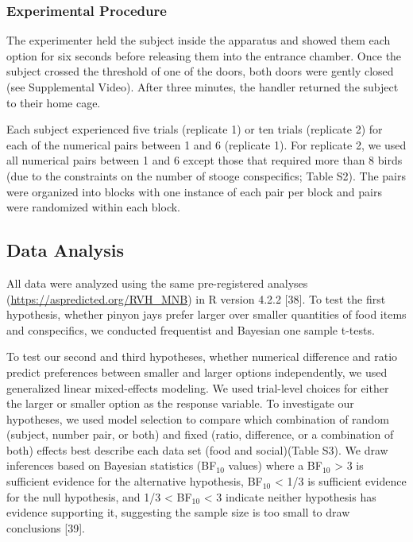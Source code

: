 \documentclass[
  ,pub,floatsintext]{apa6}
\begin{document}
\hypertarget{experimental-procedure-1}{%
\subsubsection{Experimental Procedure}\label{experimental-procedure-1}}

The experimenter held the subject inside the apparatus and showed them each option for six seconds before releasing them into the entrance chamber. Once the subject crossed the threshold of one of the doors, both doors were gently closed (see Supplemental Video). After three minutes, the handler returned the subject to their home cage.

Each subject experienced five trials (replicate 1) or ten trials (replicate 2) for each of the numerical pairs between 1 and 6 (replicate 1). For replicate 2, we used all numerical pairs between 1 and 6 except those that required more than 8 birds (due to the constraints on the number of stooge conspecifics; Table S2). The pairs were organized into blocks with one instance of each pair per block and pairs were randomized within each block.

\hypertarget{data-analysis}{%
\subsection{Data Analysis}\label{data-analysis}}

All data were analyzed using the same pre-registered analyses (\url{https://aspredicted.org/RVH_MNB}) in R version 4.2.2 {[}38{]}. To test the first hypothesis, whether pinyon jays prefer larger over smaller quantities of food items and conspecifics, we conducted frequentist and Bayesian one sample t-tests.

To test our second and third hypotheses, whether numerical difference and ratio predict preferences between smaller and larger options independently, we used generalized linear mixed-effects modeling. We used trial-level choices for either the larger or smaller option as the response variable. To investigate our hypotheses, we used model selection to compare which combination of random (subject, number pair, or both) and fixed (ratio, difference, or a combination of both) effects best describe each data set (food and social)(Table S3). We draw inferences based on Bayesian statistics (BF\(_{10}\) values) where a BF\(_{10}\) \textgreater{} 3 is sufficient evidence for the alternative hypothesis, BF\(_{10}\) \textless{} 1/3 is sufficient evidence for the null hypothesis, and 1/3 \textless{} BF\(_{10}\) \textless{} 3 indicate neither hypothesis has evidence supporting it, suggesting the sample size is too small to draw conclusions {[}39{]}.
\end{document}
